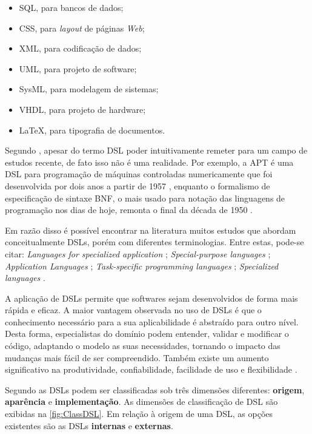 \begin{itemize}
    \item \ac{SQL}, para bancos de dados;
    \item \ac{CSS}, para \textit{layout} de páginas \textit{Web};
    \item \ac{XML}, para codificação de dados;
    \item \ac{UML}, para projeto de software;
    \item \ac{SysML}, para modelagem de sistemas;
    \item \ac{VHDL}, para projeto de hardware;
    \item \LaTeX, para tipografia de documentos.
\end{itemize}
    
Segundo , apesar do termo \ac{DSL} poder intuitivamente remeter para um campo de estudos recente, de fato isso não é uma realidade. 
Por exemplo, a APT é uma \ac{DSL} para programação de máquinas controladas numericamente que foi desenvolvida por dois anos a partir de 1957 \cite{Ross:1978}, enquanto o formalismo de especificação de sintaxe \ac{BNF}, o mais usado para notação das linguagens de programação nos dias de hoje, remonta o final da década de 1950 \cite{Backus:1959}.
    
Em razão disso é possível encontrar na literatura muitos estudos que abordam conceitualmente \acp{DSL}, porém com diferentes terminologias.
Entre estas, pode-se citar: \textit{Languages for specialized application} \cite{Sammet:1972}; \textit{Special-purpose languages} \cite{Wexelblat:1978};  \textit{Application Languages} \cite{Martin:1982}; \textit{Task-specific programming languages} \cite{Nardi:1993}; \textit{Specialized languages} \cite{Bergin:1996}. 
    
A aplicação de \acp{DSL} permite que softwares sejam desenvolvidos de forma mais rápida e eficaz. 
A maior vantagem observada no uso de \acp{DSL} é que o conhecimento necessário para a sua aplicabilidade é abstraído para outro nível. 
Desta forma, especialistas do domínio podem entender, validar e modificar o código, adaptando o modelo as suas necessidades, tornando o impacto das mudanças mais fácil de ser compreendido. 
Também existe um aumento significativo na produtividade, confiabilidade, facilidade de uso e flexibilidade \cite{vanDeursen:2000}.

Segundo  as \acp{DSL} podem ser classificadas sob três dimensões diferentes: \textbf{origem}, \textbf{aparência} e \textbf{implementação}. 
As dimensões de classificação de \ac{DSL} são exibidas na \autoref{fig:ClassDSL}. 
Em relação à origem de uma \ac{DSL}, as opções existentes são as \acp{DSL} \textbf{internas} e \textbf{externas}.

